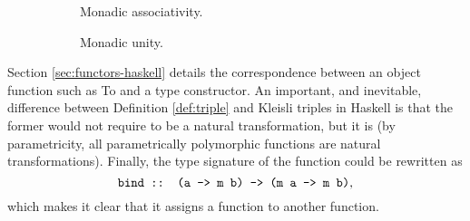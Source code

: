 \begin{figure}[htb]
  \begin{subfigure}[b]{0.5\linewidth}
    \begin{center}
    \end{center}
    \caption{Monadic associativity.}
    \label{fig:triple-associativity-haskell}
  \end{subfigure}
  \begin{subfigure}[b]{0.5\linewidth}
    \begin{center}
    \end{center}
    \caption{Monadic unity.}
    \label{fig:triple-unity-haskell}
  \end{subfigure}
  \caption{}
\end{figure}

Section \ref{sec:functors-haskell} details the correspondence between
an object function such as To and a type constructor.
An important, and inevitable, difference between Definition
\ref{def:triple} and Kleisli triples in Haskell is that the former would not
require  to be a natural transformation, but it is
(by parametricity, all parametrically polymorphic functions are
natural transformations). Finally, the type signature of the
 function could be rewritten as
\begin{equation*}
  \text{\texttt{bind :: (a -> m b) -> (m a -> m b)}}
  \text{,}
\end{equation*}
which makes it clear that it assigns a function to another function.

